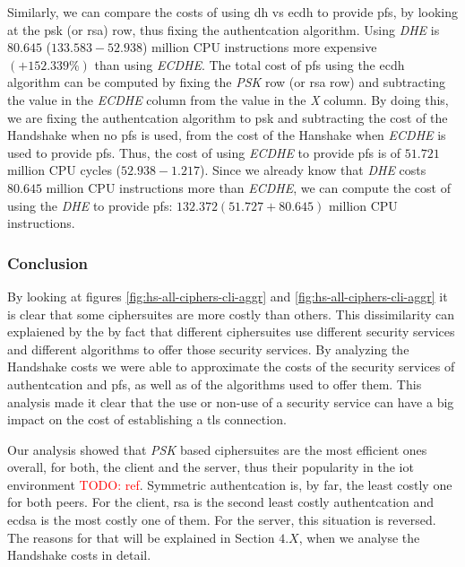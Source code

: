 \documentclass{llncs}
\newcommand{\todo}[1]{\textcolor{red}{TODO: #1}\PackageWarning{TODO:}{#1!}}
\begin{document}
Similarly, we can compare the costs of using \gls{dh} vs \gls{ecdh} to provide \gls{pfs}, by
looking at the \gls{psk} (or \gls{rsa}) row, thus fixing the authentcation algorithm. Using \textit{DHE} is 
$80.645$ ($133.583 - 52.938$) million CPU instructions more expensive $(+152.339\%)$ than using \textit{ECDHE}. The total cost of \gls{pfs}
using the \gls{ecdh} algorithm can be computed by fixing the \textit{PSK} row (or \gls{rsa} row) 
and subtracting the value in the \textit{ECDHE} column from the value in the \textit{X} column. By doing this, we are 
fixing the authentcation algorithm to \gls{psk} and subtracting the cost of the Handshake when no \gls{pfs} is used, 
from the cost of the Hanshake when \textit{ECDHE} is used to provide \gls{pfs}. Thus, the cost of using \textit{ECDHE}
to provide \gls{pfs} is of $51.721$ million CPU cycles ($52.938-1.217$). Since we already know that \textit{DHE} costs
$80.645$ million CPU instructions more than \textit{ECDHE}, we can compute the cost of using the \textit{DHE} to
provide \gls{pfs}: $132.372 (51.727+80.645)$ million CPU instructions.

\subsubsection{Conclusion}

By looking at figures \ref{fig:hs-all-ciphers-cli-aggr}
and \ref{fig:hs-all-ciphers-cli-aggr} it is clear that some ciphersuites are more costly than others. This dissimilarity
can explaiened by the by fact that different ciphersuites use different security services and different algorithms to 
offer those security services. By analyzing the Handshake costs we were able to approximate the costs of the security 
services of authentcation and \gls{pfs}, as well as of the algorithms used to offer them. This analysis made it clear that the 
use or non-use of a security service can have a big impact on the cost of establishing a \gls{tls} connection.

Our analysis showed that \textit{PSK} based ciphersuites are the most efficient ones overall, for both, the client
and the server, thus their popularity in the \gls{iot} environment \todo{ref}. Symmetric authentcation is, by far,
the least costly one for both peers. For the client, \gls{rsa} is the second least costly authentcation and \gls{ecdsa}
is the most costly one of them. For the server, this situation is reversed. The reasons for that will be explained in
Section $4.X$, when we analyse the Handshake costs in detail.
\end{document}
